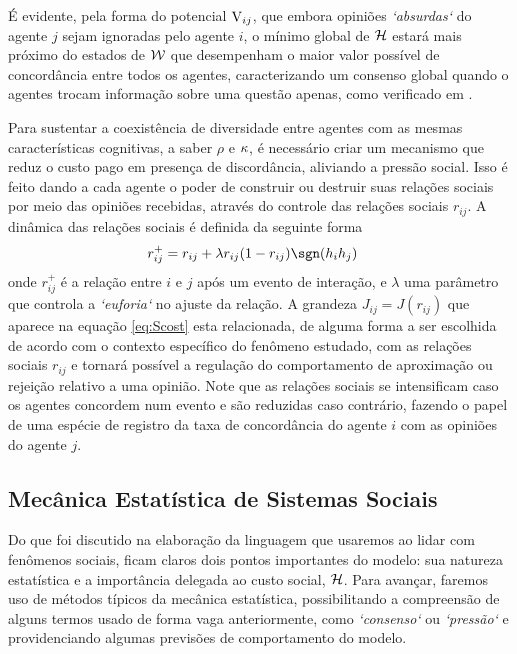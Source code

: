 É evidente, pela forma do potencial ${\mathrm{V}}_{ij}$, que embora opiniões
\emph{`absurdas`} do agente $j$ sejam ignoradas pelo agente $i$, o
mínimo global de ${\mathcal{H}}$ estará mais próximo do estados de $\mathcal{W}$ que
desempenham o maior valor possível de concordância entre todos os
agentes, caracterizando um consenso global quando o agentes trocam
informação sobre uma questão apenas, como verificado em
\parencite{Caticha2011}.

Para sustentar a coexistência de diversidade entre agentes com as
mesmas características cognitivas, a saber $\rho$ e $\kappa$, é
necessário criar um mecanismo que reduz o custo pago em presença de
discordância, aliviando a pressão social. Isso é feito dando a cada
agente o poder de construir ou destruir suas relações sociais por meio
das opiniões recebidas, através do controle das relações sociais
$r_{ij}$.  A dinâmica das relações sociais é definida da seguinte
forma
\begin{align}
  r_{ij}^{+} & = r_{ij} + \lambda r_{ij}(1 - r_{ij})\sgn(h_ih_j) \label{eq:rt}
\end{align}
onde $r_{ij}^{+}$ é a relação entre $i$ e $j$ após um evento de
interação, e $\lambda$ uma parâmetro que controla a \emph{`euforia`}
no ajuste da relação. A grandeza $J_{ij}=J(r_{ij})$ que aparece na
equação \eqref{eq:Scost} esta relacionada, de alguma forma a ser
escolhida de acordo com o contexto específico do fenômeno estudado,
com as relações sociais $r_{ij}$ e tornará possível a regulação do
comportamento de aproximação ou rejeição relativo a uma opinião. Note
que as relações sociais se intensificam caso os agentes concordem num
evento e são reduzidas caso contrário, fazendo o papel de uma espécie
de registro da taxa de concordância do agente $i$ com as opiniões do
agente $j$.

\subsection{Mecânica Estatística de Sistemas Sociais}\label{ssec:AMSM2}

Do que foi discutido na elaboração da linguagem que usaremos ao lidar
com fenômenos sociais, ficam claros dois pontos importantes do modelo:
sua natureza estatística e a importância delegada ao custo social,
${\mathcal{H}}$. Para avançar, faremos uso de métodos típicos da mecânica
estatística, possibilitando a compreensão de alguns termos usado de
forma vaga anteriormente, como \emph{`consenso`} ou \emph{`pressão`} e
providenciando algumas previsões de comportamento do modelo.

